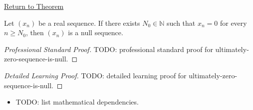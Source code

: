 \newpage
{}
\label{prf:ultimately-zero-sequence-is-null}

\begin{remark*}[Return]
\hyperref[thm:ultimately-zero-sequence-is-null]{Return to Theorem}
\end{remark*}

\begin{theorem*}
Let $(x_n)$ be a real sequence. If there exists $N_0 \in \mathbb{N}$ such
that $x_n = 0$ for every $n \ge N_0$, then $(x_n)$ is a null sequence.

\smallskip
\noindent
\end{theorem*}

\begin{proof}[Professional Standard Proof]
\LRAProofBodyStart
TODO: professional standard proof for ultimately-zero-sequence-is-null.
\end{proof}

\begin{proof}[Detailed Learning Proof]
\LRAProofBodyStart
TODO: detailed learning proof for ultimately-zero-sequence-is-null.
\end{proof}

\begin{remark*}
\end{remark*}

\begin{dependencies}
\begin{itemize}
  \item TODO: list mathematical dependencies.
\end{itemize}
\end{dependencies}

\clearpage
